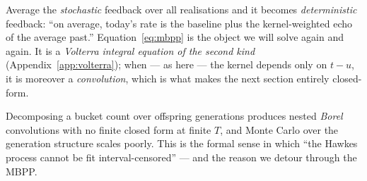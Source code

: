 \begin{intuition}
Average the \emph{stochastic} feedback over all realisations and it becomes
\emph{deterministic} feedback: ``on average, today's rate is the baseline plus the
kernel-weighted echo of the average past.'' Equation~\eqref{eq:mbpp} is the object
we will solve again and again. It is a \emph{Volterra integral equation of the
second kind} (Appendix~\ref{app:volterra}); when --- as here --- the kernel depends
only on $t-u$, it is moreover a \emph{convolution}, which is what makes the next
section entirely closed-form.
\end{intuition}

\begin{remark}
Decomposing a bucket count over offspring generations produces nested
\emph{Borel} convolutions with no finite closed form at finite $T$, and Monte
Carlo over the generation structure scales poorly. This is the formal sense in
which ``the Hawkes process cannot be fit interval-censored'' --- and the reason we
detour through the MBPP.
\end{remark}
